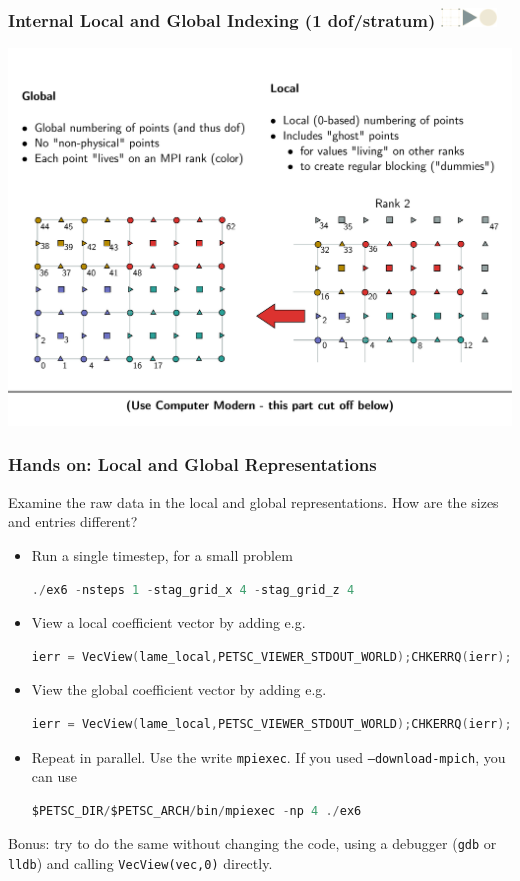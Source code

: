 \documentclass{beamer}
\newcommand\frametitlelogo[1]{\frametitle{#1\hspace{0pt plus 1 filll} \includegraphics[width=42pt]{logo_slides}}}
\begin{document}
\begin{frame}[fragile]
\frametitlelogo{Internal Local and Global Indexing (1 dof/stratum)}
\includegraphics[width=\textwidth]{global_local_numbers}
\end{frame}

\begin{frame}[fragile]
\frametitle{Hands on: Local and Global Representations}
Examine the raw data in the local and global representations. How are the sizes and entries different?
\begin{itemize}
\item Run a single timestep, for a small problem
\begin{lstlisting}[language=C,basicstyle=\scriptsize\ttfamily]
./ex6 -nsteps 1 -stag_grid_x 4 -stag_grid_z 4
\end{lstlisting}
\item View a local coefficient vector by adding e.g.
\begin{lstlisting}[language=C,basicstyle=\scriptsize\ttfamily]
ierr = VecView(lame_local,PETSC_VIEWER_STDOUT_WORLD);CHKERRQ(ierr);
\end{lstlisting}
\item View the global coefficient vector by adding e.g.
\begin{lstlisting}[language=C,basicstyle=\scriptsize\ttfamily]
ierr = VecView(lame_local,PETSC_VIEWER_STDOUT_WORLD);CHKERRQ(ierr);
\end{lstlisting}
\item Repeat in parallel. Use the write \texttt{mpiexec}. If you used \texttt{--download-mpich}, you can use
\begin{lstlisting}[language=C,basicstyle=\scriptsize\ttfamily]
$PETSC_DIR/$PETSC_ARCH/bin/mpiexec -np 4 ./ex6
\end{lstlisting}
\end{itemize}
  Bonus: try to do the same without changing the code, using a debugger (\texttt{gdb} or \texttt{lldb}) and calling \lstinline{VecView(vec,0)} directly.
\end{frame}
\end{document}
